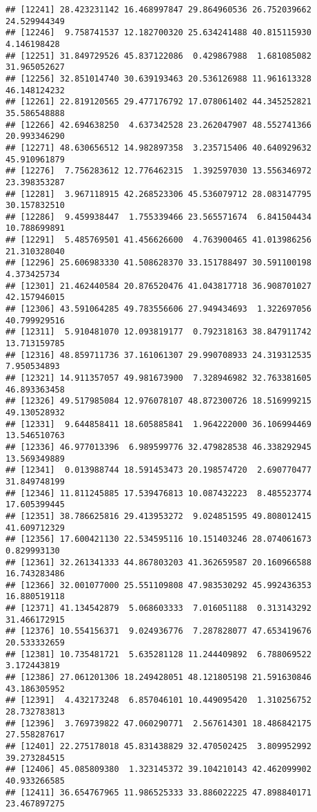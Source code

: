 \documentclass[
]{article}
\begin{document}
\begin{verbatim}
## [12241] 28.423231142 16.468997847 29.864960536 26.752039662 24.529944349
## [12246]  9.758741537 12.182700320 25.634241488 40.815115930  4.146198428
## [12251] 31.849729526 45.837122086  0.429867988  1.681085082 31.965052627
## [12256] 32.851014740 30.639193463 20.536126988 11.961613328 46.148124232
## [12261] 22.819120565 29.477176792 17.078061402 44.345252821 35.586548888
## [12266] 42.694638250  4.637342528 23.262047907 48.552741366 20.993346290
## [12271] 48.630656512 14.982897358  3.235715406 40.640929632 45.910961879
## [12276]  7.756283612 12.776462315  1.392597030 13.556346972 23.398353287
## [12281]  3.967118915 42.268523306 45.536079712 28.083147795 30.157832510
## [12286]  9.459938447  1.755339466 23.565571674  6.841504434 10.788699891
## [12291]  5.485769501 41.456626600  4.763900465 41.013986256 21.310328040
## [12296] 25.606983330 41.508628370 33.151788497 30.591100198  4.373425734
## [12301] 21.462440584 20.876520476 41.043817718 36.908701027 42.157946015
## [12306] 43.591064285 49.783556606 27.949434693  1.322697056 40.799929516
## [12311]  5.910481070 12.093819177  0.792318163 38.847911742 13.713159785
## [12316] 48.859711736 37.161061307 29.990708933 24.319312535  7.950534893
## [12321] 14.911357057 49.981673900  7.328946982 32.763381605 46.893363458
## [12326] 49.517985084 12.976078107 48.872300726 18.516999215 49.130528932
## [12331]  9.644858411 18.605885841  1.964222000 36.106994469 13.546510763
## [12336] 46.977013396  6.989599776 32.479828538 46.338292945 13.569349889
## [12341]  0.013988744 18.591453473 20.198574720  2.690770477 31.849748199
## [12346] 11.811245885 17.539476813 10.087432223  8.485523774 17.605399445
## [12351] 38.786625816 29.413953272  9.024851595 49.808012415 41.609712329
## [12356] 17.600421130 22.534595116 10.151403246 28.074061673  0.829993130
## [12361] 32.261341333 44.867803203 41.362659587 20.160966588 16.743283486
## [12366] 32.001077000 25.551109808 47.983530292 45.992436353 16.880519118
## [12371] 41.134542879  5.068603333  7.016051188  0.313143292 31.466172915
## [12376] 10.554156371  9.024936776  7.287828077 47.653419676 20.533332659
## [12381] 10.735481721  5.635281128 11.244409892  6.788069522  3.172443819
## [12386] 27.061201306 18.249428051 48.121805198 21.591630846 43.186305952
## [12391]  4.432173248  6.857046101 10.449095420  1.310256752 28.732783813
## [12396]  3.769739822 47.060290771  2.567614301 18.486842175 27.558287617
## [12401] 22.275178018 45.831438829 32.470502425  3.809952992 39.273284515
## [12406] 45.085809380  1.323145372 39.104210143 42.462099902 40.933266585
## [12411] 36.654767965 11.986525333 33.886022225 47.898840171 23.467897275

\end{verbatim}
\end{document}
